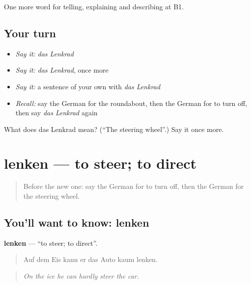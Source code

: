 \begin{grammarlens}[title={What you've built}]
One more word for telling, explaining and describing at B1.
\end{grammarlens}

\subsection*{Your turn}
\begin{itemize}
\raggedright
  \item \emph{Say it:} \emph{das Lenkrad}
  \item \emph{Say it:} \emph{das Lenkrad}, once more
  \item \emph{Say it:} a sentence of your own with \emph{das Lenkrad}
  \item \emph{Recall:} say the German for the roundabout, then the German for to turn off, then say \emph{das Lenkrad} again
\end{itemize}

\begin{tcolorbox}[breakable,colback=teal!4,colframe=teal!35!black,title={Before you move on}]
What does das Lenkrad mean? (\textquotedblleft{}The steering wheel\textquotedblright{}.) Say it once more.
\end{tcolorbox}
\section[lenken]{lenken — to steer; to direct}

\label{lesson:GE-C399-lenken}



\begin{quote}
Before the new one: say the German for to turn off, then the German for the steering wheel.
\end{quote}

\subsection*{You'll want to know: lenken}
\textbf{lenken} — \textquotedblleft{}to steer; to direct\textquotedblright{}.

\begin{quote}
Auf dem Eis kann er das Auto kaum lenken.
\end{quote}

\begin{quote}
\emph{On the ice he can hardly steer the car.}
\end{quote}

